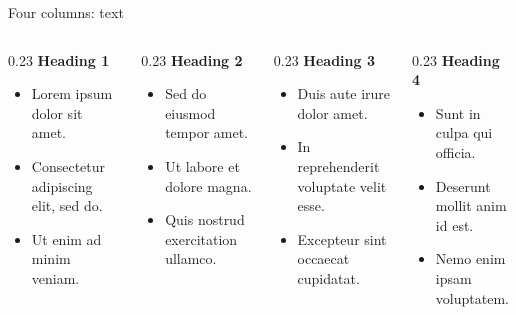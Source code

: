 \begin{frame}[t]{Four columns: text}
    \begin{columns}[T,onlytextwidth]
        \begin{column}{0.23\textwidth}
            \textbf{Heading 1}
            \begin{itemize}
                \item Lorem ipsum dolor sit amet.
                \item Consectetur adipiscing elit, sed do.
                \item Ut enim ad minim veniam.
            \end{itemize}
        \end{column}
        \begin{column}{0.23\textwidth}
            \textbf{Heading 2}
            \begin{itemize}
                \item Sed do eiusmod tempor amet.
                \item Ut labore et dolore magna.
                \item Quis nostrud exercitation ullamco.
            \end{itemize}
        \end{column}
        \begin{column}{0.23\textwidth}
            \textbf{Heading 3}
            \begin{itemize}
                \item Duis aute irure dolor amet.
                \item In reprehenderit voluptate velit esse.
                \item Excepteur sint occaecat cupidatat.
            \end{itemize}
        \end{column}
        \begin{column}{0.23\textwidth}
            \textbf{Heading 4}
            \begin{itemize}
                \item Sunt in culpa qui officia.
                \item Deserunt mollit anim id est.
                \item Nemo enim ipsam voluptatem.
            \end{itemize}
        \end{column}
    \end{columns}
\end{frame}

